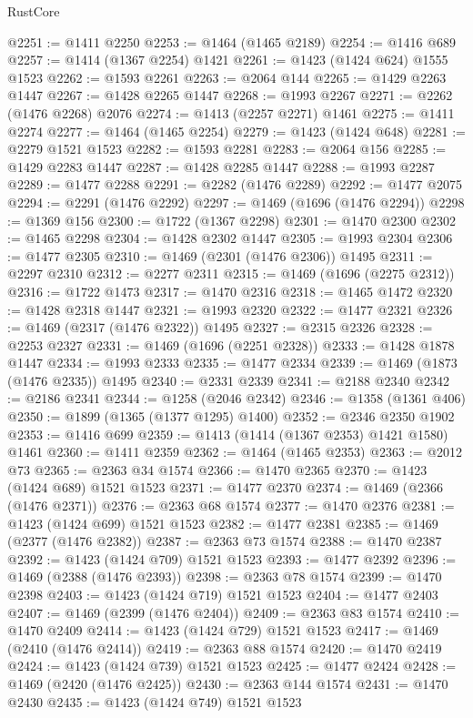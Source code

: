 \begin{lexlean}{RustCore}
\begin{coremodule}
@2251 := @1411 @2250
@2253 := @1464 (@1465 @2189)
@2254 := @1416 @689
@2257 := @1414 (@1367 @2254) @1421
@2261 := @1423 (@1424 @624) @1555 @1523
@2262 := @1593 @2261
@2263 := @2064 @144
@2265 := @1429 @2263 @1447
@2267 := @1428 @2265 @1447
@2268 := @1993 @2267
@2271 := @2262 (@1476 @2268) @2076
@2274 := @1413 (@2257 @2271) @1461
@2275 := @1411 @2274
@2277 := @1464 (@1465 @2254)
@2279 := @1423 (@1424 @648)
@2281 := @2279 @1521 @1523
@2282 := @1593 @2281
@2283 := @2064 @156
@2285 := @1429 @2283 @1447
@2287 := @1428 @2285 @1447
@2288 := @1993 @2287
@2289 := @1477 @2288
@2291 := @2282 (@1476 @2289)
@2292 := @1477 @2075
@2294 := @2291 (@1476 @2292)
@2297 := @1469 (@1696 (@1476 @2294))
@2298 := @1369 @156
@2300 := @1722 (@1367 @2298)
@2301 := @1470 @2300
@2302 := @1465 @2298
@2304 := @1428 @2302 @1447
@2305 := @1993 @2304
@2306 := @1477 @2305
@2310 := @1469 (@2301 (@1476 @2306)) @1495
@2311 := @2297 @2310
@2312 := @2277 @2311
@2315 := @1469 (@1696 (@2275 @2312))
@2316 := @1722 @1473
@2317 := @1470 @2316
@2318 := @1465 @1472
@2320 := @1428 @2318 @1447
@2321 := @1993 @2320
@2322 := @1477 @2321
@2326 := @1469 (@2317 (@1476 @2322)) @1495
@2327 := @2315 @2326
@2328 := @2253 @2327
@2331 := @1469 (@1696 (@2251 @2328))
@2333 := @1428 @1878 @1447
@2334 := @1993 @2333
@2335 := @1477 @2334
@2339 := @1469 (@1873 (@1476 @2335)) @1495
@2340 := @2331 @2339
@2341 := @2188 @2340
@2342 := @2186 @2341
@2344 := @1258 (@2046 @2342)
@2346 := @1358 (@1361 @406)
@2350 := @1899 (@1365 (@1377 @1295) @1400)
@2352 := @2346 @2350 @1902
@2353 := @1416 @699
@2359 := @1413 (@1414 (@1367 @2353) @1421 @1580) @1461
@2360 := @1411 @2359
@2362 := @1464 (@1465 @2353)
@2363 := @2012 @73
@2365 := @2363 @34 @1574
@2366 := @1470 @2365
@2370 := @1423 (@1424 @689) @1521 @1523
@2371 := @1477 @2370
@2374 := @1469 (@2366 (@1476 @2371))
@2376 := @2363 @68 @1574
@2377 := @1470 @2376
@2381 := @1423 (@1424 @699) @1521 @1523
@2382 := @1477 @2381
@2385 := @1469 (@2377 (@1476 @2382))
@2387 := @2363 @73 @1574
@2388 := @1470 @2387
@2392 := @1423 (@1424 @709) @1521 @1523
@2393 := @1477 @2392
@2396 := @1469 (@2388 (@1476 @2393))
@2398 := @2363 @78 @1574
@2399 := @1470 @2398
@2403 := @1423 (@1424 @719) @1521 @1523
@2404 := @1477 @2403
@2407 := @1469 (@2399 (@1476 @2404))
@2409 := @2363 @83 @1574
@2410 := @1470 @2409
@2414 := @1423 (@1424 @729) @1521 @1523
@2417 := @1469 (@2410 (@1476 @2414))
@2419 := @2363 @88 @1574
@2420 := @1470 @2419
@2424 := @1423 (@1424 @739) @1521 @1523
@2425 := @1477 @2424
@2428 := @1469 (@2420 (@1476 @2425))
@2430 := @2363 @144 @1574
@2431 := @1470 @2430
@2435 := @1423 (@1424 @749) @1521 @1523

\end{coremodule}
\end{lexlean}
